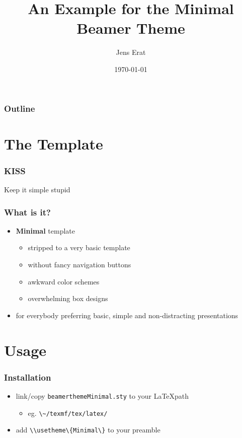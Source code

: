 \documentclass{beamer}
\title[Minimal Example]{An Example for the Minimal Beamer Theme}
\author{Jens Erat}
\date{\today}
\begin{document}
\maketitle
\clearpage

\begin{frame}
\frametitle{Outline}
\tableofcontents[hideothersubsections]
\end{frame}


\section{The Template}
\begin{frame}
\frametitle{KISS}
\begin{center}Keep it simple stupid\end{center}
\end{frame}

\begin{frame}
\frametitle{What is it?}
\begin{itemize}
	\item \textbf{Minimal} template
				\begin{itemize}
					\item stripped to a very basic template
					\item without fancy navigation buttons
					\item awkward color schemes
					\item overwhelming box designs
				\end{itemize}
	\item for everybody preferring basic, simple and non-distracting presentations
\end{itemize}
\end{frame}

\section{Usage}
\begin{frame}
\frametitle{Installation}
\begin{itemize}
	\item link/copy \lstinline!beamerthemeMinimal.sty! to your \LaTeX path
				\begin{itemize}
					\item eg. \lstinline!\~/texmf/tex/latex/!
				\end{itemize}
	\item add \lstinline!\\usetheme\{Minimal\}! to your preamble
\end{itemize}
\end{frame}
\end{document}
